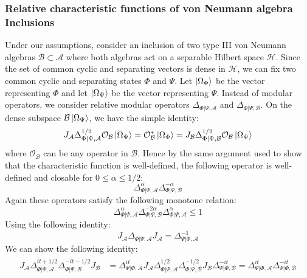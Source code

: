 \documentclass[a4paper,11pt]{article}
\theoremstyle{definition}
\begin{document}
\subsubsection{Relative characteristic functions of von Neumann algebra Inclusions}\label{subsubsection:relativecharacteristicfunction}
Under our assumptions, consider an inclusion of two type III von Neumann algebras $\mathcal{B}\subset\mathcal{A}$ where both algebras act on a separable Hilbert space $\mathcal{H}$. Since the set of common cyclic and separating vectors is dense in $\mathcal{H}$, we can fix two common cyclic and separating states $\Phi$ and $\Psi$. Let $\ket{\Omega_\Phi}$ be the vector representing $\Phi$ and let $\ket{\Omega_\Psi}$ be the vector representing $\Psi$. Instead of modular operators, we consider relative modular operators $\Delta_{\Phi|\Psi,\mathcal{A}}$ and $\Delta_{\Phi|\Psi,\mathcal{B}}$. On the dense subspace $\mathcal{B}\ket{\Omega_\Psi}$, we have the simple identity:
\begin{equation}
    J_\mathcal{A}\Delta^{1/2}_{\Phi|\Psi,\mathcal{A}}\mathcal{O}_\mathcal{B}\ket{\Omega_\Psi} = \mathcal{O}_\mathcal{B}^*\ket{\Omega_\Phi} = J_\mathcal{B}\Delta^{1/2}_{\Phi|\Psi,\mathcal{B}}\mathcal{O}_\mathcal{B}\ket{\Omega_\Psi}
\end{equation}
where $\mathcal{O}_\mathcal{B}$ can be any operator in $\mathcal{B}$. Hence by the same argument used to show that the characteristic function is well-defined, the following operator is well-defined and closable for $0\leq \alpha\leq 1/2$:
\begin{equation}
    \Delta^\alpha_{\Phi|\Psi,\mathcal{A}}\Delta^{-\alpha}_{\Phi|\Psi,\mathcal{B}}
\end{equation}
Again these operators satisfy the following monotone relation:
\begin{equation}
    \Delta_{\Phi|\Psi,\mathcal{A}}^\alpha \Delta_{\Phi|\Psi,\mathcal{B}}^{-2\alpha}\Delta_{\Phi|\Psi,\mathcal{A}}^\alpha\leq 1
\end{equation}
Using the following identity:
\begin{equation}
    J_\mathcal{A}\Delta_{\Phi|\Psi,\mathcal{A}}J_\mathcal{A} = \Delta_{\Psi|\Phi,\mathcal{A}}^{-1}
\end{equation}
We can show the following identity:
\begin{align}
    \begin{split}
        J_\mathcal{A}\Delta_{\Phi|\Psi,\mathcal{A}}^{it+1/2}\Delta_{\Phi|\Psi,\mathcal{B}}^{-it-1/2}J_\mathcal{B} &= \Delta_{\Psi|\Phi,\mathcal{A}}^{it}J_\mathcal{A}\Delta_{\Phi|\Psi,\mathcal{A}}^{1/2}\Delta_{\Phi|\Psi,\mathcal{B}}^{-1/2}J_\mathcal{B}\Delta_{\Psi|\Phi,\mathcal{B}}^{-it} = \Delta_{\Psi|\Phi,\mathcal{A}}^{it}\Delta_{\Psi|\Phi,\mathcal{B}}^{-it}
    \end{split}
\end{align}
\end{document}
